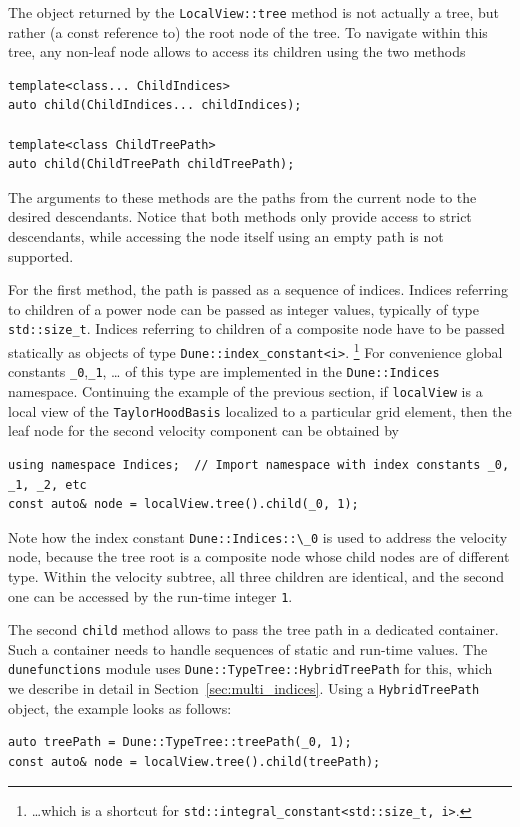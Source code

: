 \documentclass[a4paper,10pt,headings=normal,bibliography=totoc]{scrartcl}
\newcommand{\cpp}[1]{\lstinline[basicstyle=\ttfamily]!#1!}
\newcommand{\dunemodule}[1]{\texttt{#1}}
\begin{document}
The object returned by the \cpp{LocalView::tree} method is not actually a tree,
but rather (a const reference to) the root node of the tree.  To navigate within
this tree, any non-leaf node allows to access
its children using the two methods
\begin{lstlisting}[style=Interface]
template<class... ChildIndices>
auto child(ChildIndices... childIndices);

template<class ChildTreePath>
auto child(ChildTreePath childTreePath);
\end{lstlisting}
The arguments to these methods are the paths from the current node to the desired
descendants.
Notice that both methods only provide access to strict descendants,
while accessing the node itself using an empty path is not supported.

For the first method, the path is passed
as a sequence of indices. Indices referring
to children of a power node can be passed as integer values, typically of type \cpp{std::size_t}.
Indices referring to children of a composite node
have to be passed statically as objects of type \cpp{Dune::index_constant<i>}.%
%
\footnote{
\dots which is a shortcut for \cpp{std::integral_constant<std::size_t, i>}.
}
%
For convenience global constants \cpp{_0},\cpp{_1}, \dots
of this type are implemented in the \cpp{Dune::Indices}
namespace.
Continuing the example of the previous section, if \cpp{localView} is a
local view of the \cpp{TaylorHoodBasis} localized to a particular grid element,
then the leaf node for the second velocity
component can be obtained by
%
\begin{lstlisting}[style=Example]
using namespace Indices;  // Import namespace with index constants _0, _1, _2, etc
const auto& node = localView.tree().child(_0, 1);
\end{lstlisting}
%
Note how the index constant \cpp{Dune::Indices::\_0} is used
to address the velocity node, because the
tree root is a composite node whose child nodes are of different type.
Within the velocity subtree, all three children are identical, and the second one can be
accessed by the run-time integer \cpp{1}.

The second \cpp{child} method allows to pass the tree path in a dedicated container.
Such a container needs to handle sequences of static and run-time values.
The \dunemodule{dune\-functions} module uses \cpp{Dune::TypeTree::HybridTreePath}
for this, which we describe in detail in Section~\ref{sec:multi_indices}.
Using a \cpp{HybridTreePath} object, the example looks as follows:
%
\begin{lstlisting}[style=Example]
auto treePath = Dune::TypeTree::treePath(_0, 1);
const auto& node = localView.tree().child(treePath);
\end{lstlisting}
\end{document}
